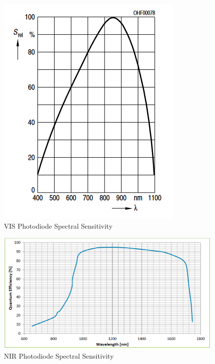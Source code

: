 \begin{figure}[H]
    \caption{VIS Photodiode Spectral Sensitivity}
    \centering
    \includegraphics[width=\textwidth]{images/NewarkBPX61.png}
\end{figure}

\begin{figure}[H]
    \caption{NIR Photodiode Spectral Sensitivity}
    \centering
    \includegraphics[width=\textwidth]{images/DigikeyExcilitasNIRSensor.png}
\end{figure}